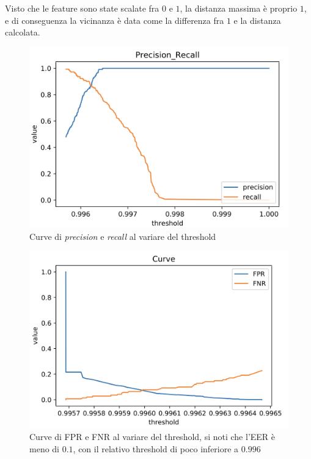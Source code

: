 \documentclass[8pt,notitlepage]{report}
\begin{document}
			Visto che le feature sono state scalate fra $ 0 $ e $ 1 $, la distanza massima è proprio $ 1 $, e di conseguenza la vicinanza è data come la differenza fra $ 1 $ e la distanza calcolata. 
			
			\begin{figure}[H]
				\begin{center}
					\includegraphics[scale=.45]{precision_recall_DTW}
					\caption{Curve di \textit{precision} e \textit{recall} al variare del threshold}
				\end{center}
			\end{figure}
			
			\begin{figure}[H]
				\begin{center}
					\includegraphics[scale=.45]{fpr_fnr_DTW}
					\caption{Curve di FPR e FNR al variare del threshold, si noti che l'EER è meno di $ 0.1 $, con il relativo threshold di poco inferiore a $ 0.996 $}
				\end{center}
			\end{figure}
		
\end{document}
